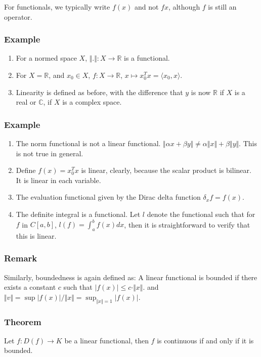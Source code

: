 \documentclass[11pt]{article}
\def\R{\mathbb{R}}
\def\C{\mathbb{C}}
\begin{document}
For functionals, we typically write \(f(x)\) and not \(fx\), although \(f\) is
still an operator.
\subsubsection{Example}
\label{sec:org48b1e29}
\begin{enumerate}
\item For a normed space \(X\), \(\Vert . \Vert \colon X \rightarrow \R\) is a functional.
\item For \(X=\R\), and \(x_0 \in X\), \(f\colon X\rightarrow \R\), \(x\mapsto x_0^{T}x
       = \langle x_0, x\rangle\).
\item Linearity is defined as before, with the difference that \(y\) is now \(\R\)
if \(X\) is a real or \(\C\), if \(X\) is a complex space.
\end{enumerate}
\subsubsection{Example}
\label{sec:orgbc3ed6e}
\begin{enumerate}
\item The norm functional is not a linear functional. \(\Vert \alpha x + \beta y
       \Vert \neq \alpha \Vert x \Vert + \beta \Vert y \Vert\). This is not true
in general.
\item Define \(f(x) = x_0^{T}x\) is linear, clearly, because the scalar product
is bilinear. It is linear in each variable.
\item The evaluation functional given by the Dirac delta function \(\delta_x f =
       f(x)\).
\item The definite integral is a functional. Let \(l\) denote the functional such
that for \(f\) in \(C[a, b]\), \(l(f) = \int_{a}^{b} f(x) dx\), then it is
straightforward to verify that this is linear.
\end{enumerate}
\subsubsection{Remark}
\label{sec:orgcc0bff2}
Similarly, boundedness is again defined as: A linear functional is bounded
if there exists a constant \(c\) such that \(\vert f(x) \vert \le c \cdot \Vert
    x \Vert\). and \(\Vert v \Vert = \sup \vert f(x) \vert / \Vert x \Vert =
    \sup_{\Vert x \Vert = 1} \vert f(x) \vert\).
\subsubsection{Theorem}
\label{sec:orga5a3f72}
Let \(f\colon D(f) \rightarrow K\) be a linear functional, then \(f\) is
continuous if and only if it is bounded.
\end{document}
